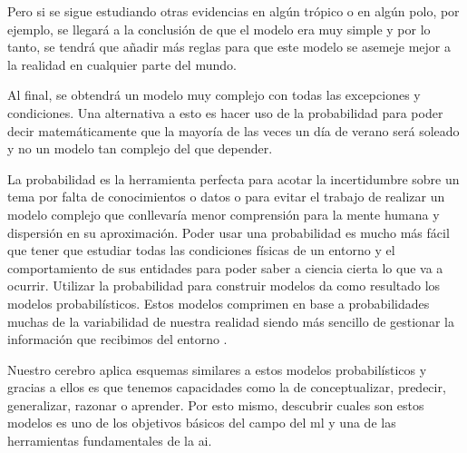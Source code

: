 Pero si se sigue estudiando otras evidencias en algún trópico o en algún polo, por ejemplo, se llegará a la conclusión de que el modelo era muy simple y por lo tanto, se tendrá que añadir más reglas para que este modelo se asemeje mejor a la realidad en cualquier parte del mundo.
\newline

Al final, se obtendrá un modelo muy complejo con todas las excepciones y condiciones. Una alternativa a esto es hacer uso de la probabilidad para poder decir matemáticamente que la mayoría de las veces un día de verano será soleado y no un modelo tan complejo del que depender. 
\newline

La probabilidad es la herramienta perfecta para acotar la incertidumbre sobre un tema por falta de conocimientos o datos o para evitar el trabajo de realizar un modelo complejo que conllevaría menor comprensión para la mente humana y dispersión en su aproximación. Poder usar una probabilidad es mucho más fácil que tener que estudiar todas las condiciones físicas de un entorno y el comportamiento de sus entidades para poder saber a ciencia cierta lo que va a ocurrir. Utilizar la probabilidad para construir modelos da como resultado los modelos probabilísticos. Estos modelos comprimen en base a probabilidades muchas de la variabilidad de nuestra realidad siendo más sencillo de gestionar la información que recibimos del entorno \cite{kuhne}.
\newline

Nuestro cerebro aplica esquemas similares a estos modelos probabilísticos y gracias a ellos es que tenemos capacidades como la de conceptualizar, predecir, generalizar, razonar o aprender. Por esto mismo, descubrir cuales son estos modelos es uno de los objetivos básicos del campo del \acrlong{ml} y una de las herramientas fundamentales de la \acrshort{ai}.
\newline
